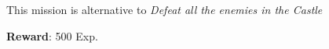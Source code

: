 This mission is alternative to \textit{Defeat all the enemies in the Castle}

\textbf{Reward}: 500 Exp.


%
%
%
